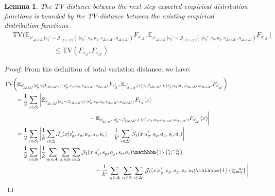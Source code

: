 \documentclass{article}
\theoremstyle{plain}
\newtheorem{lemma}[theorem]{Lemma}
\theoremstyle{definition}
\def\E{\mathbb{E}}
\begin{document}
\begin{lemma}\label{tv_s_to_z_bound}\emph{The TV-distance between the next-step expected empirical distribution functions is bounded by the TV-distance between the existing empirical distribution functions.}
    \begin{align*}
&\mathrm{TV}\bigg(\E_{s'_{\Delta\cup\Delta'}|s_g' \sim \mathcal{J}_{|\Delta\cup\Delta'|}(\cdot|s_g',s_g,a_g,s_{\Delta\cup\Delta'},a_{\Delta\cup\Delta'})}F_{s'_\Delta},\E_{s'_{\Delta\cup\Delta'}|s_g' \sim \mathcal{J}_{|\Delta\cup\Delta'|}(\cdot|s_g',s_g,a_g,s_{\Delta\cup\Delta'},a_{\Delta\cup\Delta'})}F_{s'_{\Delta'}}\bigg) \\&\quad\quad\quad\quad\quad\quad \leq \mathrm{TV}(F_{z_\Delta}, F_{z_{\Delta'}})
    \end{align*}
\end{lemma}
\begin{proof} From the definition of total variation distance, we have:
\begin{align*}
&\mathrm{TV}\bigg(\E_{s'_{\Delta\cup\Delta'}|s_g' \sim \mathcal{J}_{|\Delta\cup\Delta'|}(\cdot|s_g',s_g,a_g,s_{\Delta\cup\Delta'},a_{\Delta\cup\Delta'}}F_{s'_\Delta},\E_{s'_{\Delta\cup\Delta'}|s_g' \sim \mathcal{J}_{|\Delta\cup\Delta'|}(\cdot|s_g',s_g,a_g,s_{\Delta\cup\Delta'},a_{\Delta\cup\Delta'}}F_{s'_{\Delta'}}\bigg) \\
    &\quad\quad= \frac{1}{2}\sum_{x\in\mathcal{S}_l}\bigg|\mathbb{E}_{s'_{\Delta\cup\Delta'}|s_g'\sim \mathcal{J}_{|\Delta\cup\Delta'|}(\cdot|s_g',s_g,a_g,s_{\Delta\cup\Delta'},a_{\Delta\cup\Delta'})}F_{s'_{\Delta}}(x) \\
    &\quad\quad\quad\quad\quad\quad\quad\quad\quad\quad\quad\quad\quad \quad\quad - \mathbb{E}_{s'_{\Delta\cup\Delta'}|s_g'\sim \mathcal{J}_{|\Delta\cup\Delta'|}(\cdot|s_g',s_g,a_g,s_{\Delta\cup\Delta'},a_{\Delta\cup\Delta'})}F_{s'_{\Delta'}}(x)\bigg| \\
    &\quad\quad= \frac{1}{2}\sum_{x\in\mathcal{S}_l}\bigg| \frac{1}{k}\sum_{i\in\Delta}\mathcal{J}_{1}(x|s_g',s_g,a_g,s_{i},a_{i}) - \frac{1}{k'}\sum_{i\in\Delta'}\mathcal{J}_{1}(x|s_g',s_g,a_g,s_{i},a_{i})\bigg|\\
    &\quad\quad= \frac{1}{2}\sum_{x\in\mathcal{S}_l}\bigg|\frac{1}{k}\sum_{a_l\in\mathcal{A}_l}\sum_{s_l\in\mathcal{S}_l}\sum_{i\in\Delta}\mathcal{J}_{1}(x|s_g', s_g, a_g, s_i, a_i)\mathbbm{1}\left\{\substack{a_i = a_l\\ s_i = s_l}\right\} \\
    &\quad\quad\quad\quad\quad\quad\quad\quad\quad \quad\quad\quad\quad \quad\quad\quad -\frac{1}{k'}\sum_{a_l\in\mathcal{A}_l}\sum_{s_l\in\mathcal{S}_l}\sum_{i\in\Delta'}\mathcal{J}_{1}(x|s_g',s_g,a_g,s_i, a_i)\mathbbm{1}\left\{\substack{a_i = a_l \\ s_i =s_l}\right\}\bigg| \\

\end{align*}
\end{proof}
\end{document}
